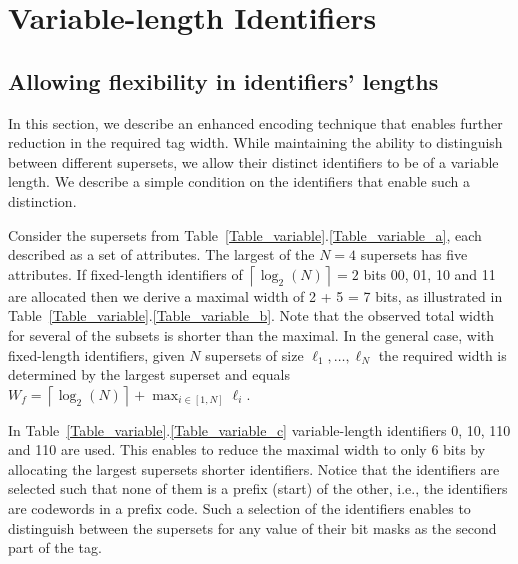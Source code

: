 \section{Variable-length Identifiers}\label{sec:identifiers}
\subsection{Allowing flexibility in identifiers' lengths}
In this section, we describe an enhanced encoding technique that enables further reduction in the required tag width.  While maintaining the ability to distinguish between different supersets, we allow their distinct identifiers to be of a variable length. We describe a simple condition on the identifiers that enable such a distinction. 

Consider the supersets from Table~\ref{Table_variable}.\ref{Table_variable_a}, each described as a set of attributes. The largest of the $N=4$ supersets has five attributes. 
If fixed-length identifiers of $\left \lceil \log_2(N) \right \rceil = 2$ bits 00, 01, 10 and 11 are allocated then we derive a maximal width of 2 + 5 = 7 bits, as illustrated in Table~\ref{Table_variable}.\ref{Table_variable_b}. 
Note that the observed total width for several of the subsets is shorter than the maximal.
In the general case, with fixed-length identifiers, given $N$ supersets of size $\ell_1, \ldots, \ell_N$ the required width is determined by the largest superset and equals 
 $W_{f} = \left \lceil \log_2(N) \right \rceil + \max_{i \in [1,N]} \ell_i$. 

In Table~\ref{Table_variable}.\ref{Table_variable_c} variable-length identifiers 0, 10, 110 and 110 are used. This enables to reduce the maximal width to only 6 bits by allocating the largest supersets shorter identifiers. 
Notice that the identifiers are selected such that none of them is a prefix (start) of the other, i.e., the identifiers are codewords in a prefix code.
Such a selection of the identifiers enables to distinguish between the supersets for any value of their bit masks as the second part of the tag. 



%
%









